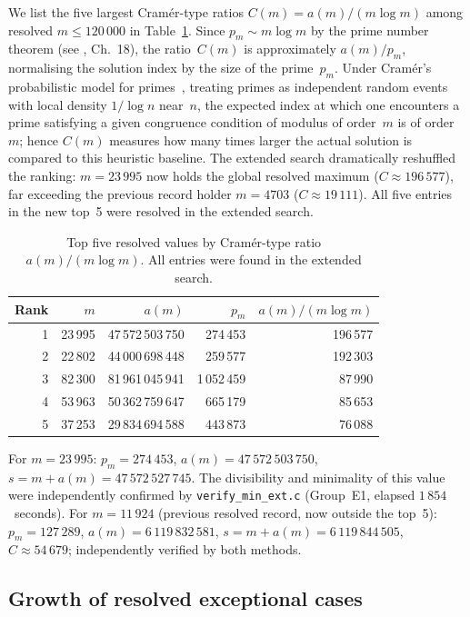 \documentclass{amsart}
\theoremstyle{definition}
\theoremstyle{remark}
\numberwithin{equation}{section}
\begin{document}
We list the five largest Cram\'er-type ratios
$C(m) = a(m)/(m\log m)$ among resolved $m \leq 120\,000$
in Table~\ref{tab:ratio}.
Since $p_m \sim m\log m$ by the prime number theorem
(see \cite{Davenport}, Ch.~18), the ratio~$C(m)$
is approximately $a(m)/p_m$,
normalising the solution index by the size of the prime~$p_m$.
Under Cram\'er's probabilistic model for
primes~\cite{Cramer1936}, treating primes as independent random
events with local density $1/\log n$ near~$n$, the expected index
at which one encounters a prime satisfying a given congruence
condition of modulus of order~$m$ is of order~$m$; hence $C(m)$
measures how many times larger the actual solution is compared to
this heuristic baseline.
The extended search dramatically reshuffled the ranking:
$m = 23\,995$ now holds the global resolved maximum
($C \approx 196\,577$), far exceeding the previous record holder
$m = 4703$ ($C \approx 19\,111$).
All five entries in the new top~5 were resolved in the extended search.

\begin{table}[ht]
	\centering
	\caption{Top five resolved values by Cram\'er-type ratio
		$a(m)/(m\log m)$.  All entries were found in the extended search.}
	\label{tab:ratio}
	\begin{tabular}{rrrrr}
		\toprule
		Rank & $m$ & $a(m)$ & $p_m$ & $a(m)/(m\log m)$ \\
		\midrule
		1 & 23\,995 & 47\,572\,503\,750 &  274\,453 & 196\,577 \\
		2 & 22\,802 & 44\,000\,698\,448 &  259\,577 & 192\,303 \\
		3 & 82\,300 & 81\,961\,045\,941 & 1\,052\,459 & 87\,990 \\
		4 & 53\,963 & 50\,362\,759\,647 &  665\,179 & 85\,653 \\
		5 & 37\,253 & 29\,834\,694\,588 &  443\,873 & 76\,088 \\
		\bottomrule
	\end{tabular}
\end{table}

For $m = 23\,995$: $p_m = 274\,453$,
$a(m) = 47\,572\,503\,750$,
$s = m + a(m) = 47\,572\,527\,745$.
The divisibility and minimality of this value were independently
confirmed by \texttt{verify\_min\_ext.c} (Group~E1, elapsed
$1\,854$~seconds).
For $m = 11\,924$ (previous resolved record, now outside the top~5):
$p_m = 127\,289$, $a(m) = 6\,119\,832\,581$,
$s = m + a(m) = 6\,119\,844\,505$,
$C \approx 54\,679$; independently verified by both methods.

\subsection{Growth of resolved exceptional cases}
\end{document}
